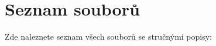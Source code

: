 \section{Seznam souborů}
Zde naleznete seznam všech souborů se stručnými popisy:\begin{DoxyCompactList}
\item{}
\item{}
\item{}
\end{DoxyCompactList}
